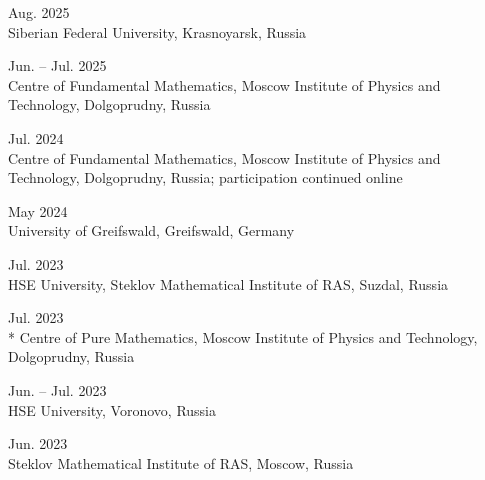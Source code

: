 \documentclass[11pt,letterpaper]{report}
\begin{document}
\begin{tablist}
      \item{Aug. 2025} \\ Siberian Federal University, Krasnoyarsk, Russia

      \item{Jun. -- Jul. 2025} \\ Centre of Fundamental Mathematics, Moscow Institute of Physics and Technology, Dolgoprudny, Russia

      \item{Jul. 2024} \\ Centre of Fundamental Mathematics, Moscow Institute of Physics and Technology, Dolgoprudny, Russia; participation continued online
       
      \item{May 2024} \\ University of Greifswald, Greifswald, Germany 
      
      \item{Jul. 2023} \\ HSE University, Steklov Mathematical Institute of RAS, Suzdal, Russia
      
      \item{Jul. 2023}  \\* Centre of Pure Mathematics, Moscow Institute of Physics and Technology, Dolgoprudny, Russia

      \item{Jun. -- Jul. 2023} \\ HSE University, Voronovo, Russia
      
      \item{Jun. 2023} \\ Steklov Mathematical Institute of RAS, Moscow, Russia
      

\end{tablist}
\end{document}
